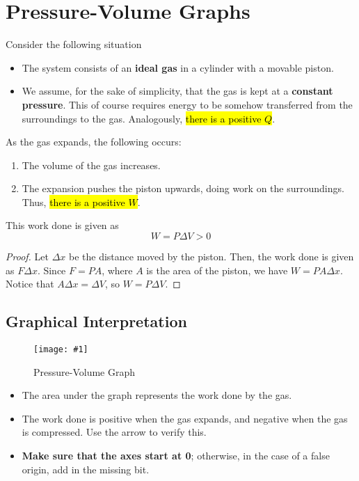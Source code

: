 \documentclass[a4paper,12pt]{article}
\let\oldsection\section
\renewcommand\section{\clearpage\oldsection}
\newcommand{\img}[4]{\begin{center}
  \begin{figure}[H]
    \centering
    \texttt{[image: \#1]}
    \caption{#3}
    \label{fig:#4}
  \end{figure}
\end{center}}
\begin{document}
\section{Pressure-Volume Graphs}

Consider the following situation
\begin{itemize}
  \item The system consists of an \textbf{ideal gas} in a cylinder with a movable piston.
  \item We assume, for the sake of simplicity, that the gas is kept at a \textbf{constant pressure}. This of course requires energy to be somehow transferred from the surroundings to the gas. Analogously, \hl{there is a positive $Q$}.
\end{itemize}

As the gas expands, the following occurs:
\begin{enumerate}
  \item The volume of the gas increases.
  \item The expansion pushes the piston upwards, doing work on the surroundings. Thus, \hl{there is a positive $W$}.
\end{enumerate}

This work done is given as \begin{equation}\label{eq:pistonwork}
  W = P \Delta V > 0
\end{equation}
\begin{proof}
  Let $\Delta x$ be the distance moved by the piston. Then, the work done is given as $F\Delta x$. Since $F = PA$, where $A$ is the area of the piston, we have $W = PA\Delta x$. Notice that $A\Delta x = \Delta V$, so $W = P\Delta V$.
\end{proof}

\subsection{Graphical Interpretation}

\begin{minipage}{0.35\textwidth}
  \img{pvarea.png}{1}{Pressure-Volume Graph}{pvarea}
\end{minipage}%
\hspace*{0.02\textwidth}%
\begin{minipage}{0.6\textwidth}
  \begin{itemize}
    \item The area under the graph represents the work done by the gas.
    \item The work done is positive when the gas expands, and negative when the gas is compressed. Use the arrow to verify this.
    \item \textbf{Make sure that the axes start at 0}; otherwise, in the case of a false origin, add in the missing bit.
  \end{itemize}

\end{minipage}
\end{document}
